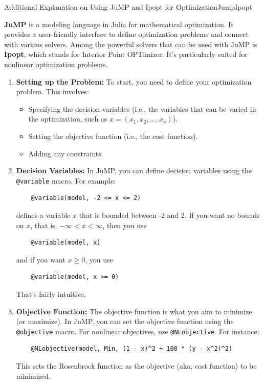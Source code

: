 \begin{methodColor}{Additional Explanation on Using JuMP and Ipopt for Optimization}{JumpIpopt}
    
\textbf{JuMP} is a modeling language in Julia for mathematical optimization. It provides a user-friendly interface to define optimization problems and connect with various solvers. Among the powerful solvers that can be used with JuMP is \textbf{Ipopt}, which stands for Interior Point OPTimizer. It's particularly suited for nonlinear optimization problems.

\begin{enumerate}
\renewcommand{\labelenumi}{(\alph{enumi})}
\setlength{\itemsep}{.2cm}

\item \textbf{Setting up the Problem:} To start, you need to define your optimization problem. This involves:
    \begin{itemize}
        \item Specifying the decision variables (i.e., the variables that can be varied in the optimization, such as $x = (x_1, x_2, \ldots, x_n)$).
        \item Setting the objective function (i.e., the cost function).
        \item Adding any constraints.
    \end{itemize}
    
    \item \textbf{Decision Variables:} In JuMP, you can define decision variables using the \texttt{@variable} macro. For example:
    \begin{verbatim}
    @variable(model, -2 <= x <= 2)
    \end{verbatim}
    defines a variable \( x \) that is bounded between -2 and 2. If you want no bounds on $x$, that is, $-\infty < x < \infty$, then you use
    \begin{verbatim}
    @variable(model, x)
    \end{verbatim}
    and if you want $x \ge 0$, you use
     \begin{verbatim}
    @variable(model, x >= 0)
    \end{verbatim}
    That's fairly intuitive.

    
    \item \textbf{Objective Function:} The objective function is what you aim to minimize (or maximize). In JuMP, you can set the objective function using the \texttt{@objective} macro. For nonlinear objectives, use \texttt{@NLobjective}. For instance:
    \begin{verbatim}
    @NLobjective(model, Min, (1 - x)^2 + 100 * (y - x^2)^2)
    \end{verbatim}
    This sets the Rosenbrock function as the objective (aka, cost function) to be minimized.
    

\end{enumerate}
\end{methodColor}
